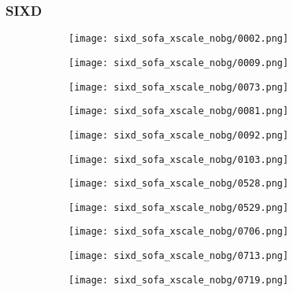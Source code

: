\subsubsection{SIXD}
\begin{figure}[h!]
  \centering
  \begin{subfigure}[b]{0.32\linewidth}
    \texttt{[image: sixd\_sofa\_xscale\_nobg/0002.png]}
  \end{subfigure}
  \begin{subfigure}[b]{0.32\linewidth}
    \texttt{[image: sixd\_sofa\_xscale\_nobg/0009.png]}
  \end{subfigure}
  \begin{subfigure}[b]{0.32\linewidth}
    \texttt{[image: sixd\_sofa\_xscale\_nobg/0073.png]}
  \end{subfigure}
  \begin{subfigure}[b]{0.32\linewidth}
    \texttt{[image: sixd\_sofa\_xscale\_nobg/0081.png]}
  \end{subfigure}
  \begin{subfigure}[b]{0.32\linewidth}
    \texttt{[image: sixd\_sofa\_xscale\_nobg/0092.png]}
  \end{subfigure}
  \begin{subfigure}[b]{0.32\linewidth}
    \texttt{[image: sixd\_sofa\_xscale\_nobg/0103.png]}
  \end{subfigure}
  \begin{subfigure}[b]{0.32\linewidth}
    \texttt{[image: sixd\_sofa\_xscale\_nobg/0528.png]}
  \end{subfigure}
  \begin{subfigure}[b]{0.32\linewidth}
    \texttt{[image: sixd\_sofa\_xscale\_nobg/0529.png]}
  \end{subfigure}
  \begin{subfigure}[b]{0.32\linewidth}
    \texttt{[image: sixd\_sofa\_xscale\_nobg/0706.png]}
  \end{subfigure}
  \begin{subfigure}[b]{0.32\linewidth}
    \texttt{[image: sixd\_sofa\_xscale\_nobg/0713.png]}
  \end{subfigure}
  \begin{subfigure}[b]{0.32\linewidth}
    \texttt{[image: sixd\_sofa\_xscale\_nobg/0719.png]}
  \end{subfigure}
  \begin{subfigure}[b]{0.32\linewidth}

\end{subfigure}
\end{figure}
